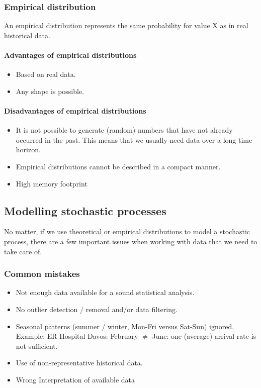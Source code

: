\subsubsection{Empirical distribution}
An empirical distribution represents the same probability for value X as
in real historical data.

\paragraph{Advantages of empirical distributions}
\begin{itemize}
	\tightlist
	\item Based on real data.
	\item Any shape is possible.
\end{itemize}

\paragraph{Disadvantages of empirical distributions}
\begin{itemize}
	\tightlist
	\item It is not possible to generate (random) numbers that have not already
	occurred in the past. This means that we usually need data over a long
	time horizon.
	\item Empirical distributions cannot be described in a compact manner.
	\item High memory footprint
\end{itemize}

\subsection{Modelling stochastic processes}
No matter, if we use theoretical or empirical distributions to model a
stochastic process, there are a few important issues when working with
data that we need to take care of.

\subsubsection{Common mistakes}

\begin{itemize}
	\item Not enough data available for a sound statistical analysis.
	\item No outlier detection / removal and/or data filtering.
	\item Seasonal patterns (summer / winter, Mon-Fri versus Sat-Sun)
	ignored. Example: ER Hospital Davos: February $\ne$ June: one
	(average) arrival rate is not sufficient.
	\item Use of non-representative historical data.
	\item Wrong Interpretation of available data
\end{itemize}

